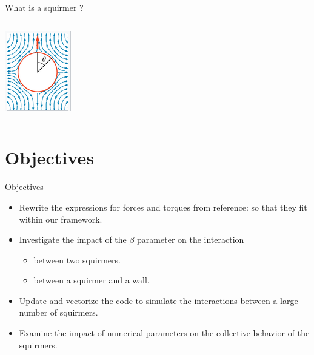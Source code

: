\documentclass{beamer}
\begin{document}
\begin{frame}{What is a squirmer ?}
\begin{columns}[T]
\begin{column}{0.5\textwidth}
            \includegraphics[width=\textwidth]{../images/squirmer.png}
            \cite{Wikipedia}
        \end{column}
    \end{columns}
\end{frame}

\section{Objectives}
\begin{frame}{Objectives}
    \begin{itemize}
        \item Rewrite the expressions for forces and torques from reference:\cite{Brumley} so that they fit within our framework.
        \item Investigate the impact of the $\beta$ parameter on the interaction
        \begin{itemize}
            \item between two squirmers.
            \item between a squirmer and a wall.
        \end{itemize}
        \item Update and vectorize the code to simulate the interactions between a large number of squirmers.
        \item Examine the impact of numerical parameters on the collective behavior of the squirmers.
    \end{itemize}
\end{frame}
\end{document}
